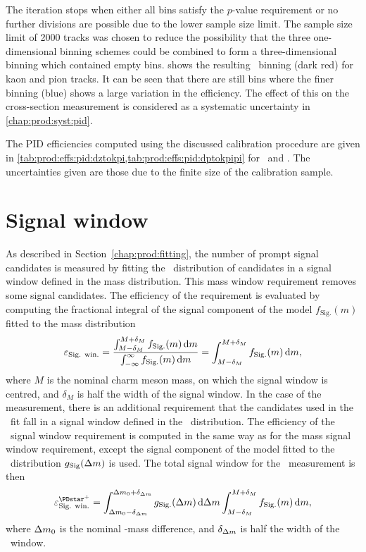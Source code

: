 The iteration stops when either all bins satisfy the $p$-value requirement or 
no further divisions are possible due to the lower sample size limit.
The sample size limit of 2000 tracks was chosen to reduce the possibility that 
the three one-dimensional binning schemes could be combined to form a 
three-dimensional binning which contained empty bins.
 shows the resulting 
\ptotetanspd\ binning (dark red) for kaon and pion tracks.
It can be seen that there are still bins where the finer binning (blue) shows a 
large variation in the efficiency.
The effect of this on the cross-section measurement is considered as a 
systematic uncertainty in \cref{chap:prod:syst:pid}.

The \acl{PID} efficiencies computed using the discussed calibration procedure 
are given in \cref{tab:prod:effs:pid:dztokpi,tab:prod:effs:pid:dptokpipi} for 
\DzToKpi\ and \DpToKpipi.
The uncertainties given are those due to the finite size of the calibration 
sample.

\section{Signal window}
\label{chap:prod:effs:signal_window}

As described in Section~\ref{chap:prod:fitting}, the number of prompt signal 
candidates is measured by fitting the \lnipchisq\ distribution of candidates in 
a signal window defined in the mass distribution.
This mass window requirement removes some signal candidates.
The efficiency of the requirement is evaluated by computing the fractional 
integral of the signal component of the model $f_{\text{Sig.}}(m)$ fitted to 
the mass distribution
\begin{equation}
  \effsigwin = \frac{%
    \int_{M - \delta_{M}}^{M +\delta_{M}} f_{\text{Sig.}}(m) \dif{m}
  }{%
    \int_{-\infty}^{\infty} f_{\text{Sig.}}(m) \dif{m}
  }
  = \int_{M - \delta_{M}}^{M +\delta_{M}} f_{\text{Sig.}}(m) \dif{m},
    \label{eqn:prod:effs:signal_window}
\end{equation}
where $M$ is the nominal charm meson mass, on which the signal window is 
centred, and $\delta_{M}$ is half the width of the signal window.
In the case of the \PDstarp measurement, there is an additional requirement 
that the candidates used in the \lnipchisq\ fit fall in a signal window defined 
in the \deltam\ distribution.
The efficiency of the \deltam\ signal window requirement is computed in the 
same way as for the mass signal window requirement, except the signal component 
of the model fitted to the \deltam\ distribution $g_{\text{Sig}}(\Delta{m})$ is 
used.
The total signal window for the \PDstarp\ measurement is then
\begin{equation}
  \effsigwin^{\PDstarp} =
    \int_{\deltam_{0} - \delta_{\deltam}}^{\deltam_{0} +\delta_{\deltam}} g_{\text{Sig.}}(\deltam) \dif{\deltam}
    \int_{M - \delta_{M}}^{M +\delta_{M}} f_{\text{Sig.}}(m) \dif{m},
    \label{eqn:prod:effs:signal_window:dst}
\end{equation}
where $\Delta{m}_{0}$ is the nominal \PDstarp-\PDzero mass difference, and $\delta_{\Delta{m}}$ is half the width of the \deltam\ window.


